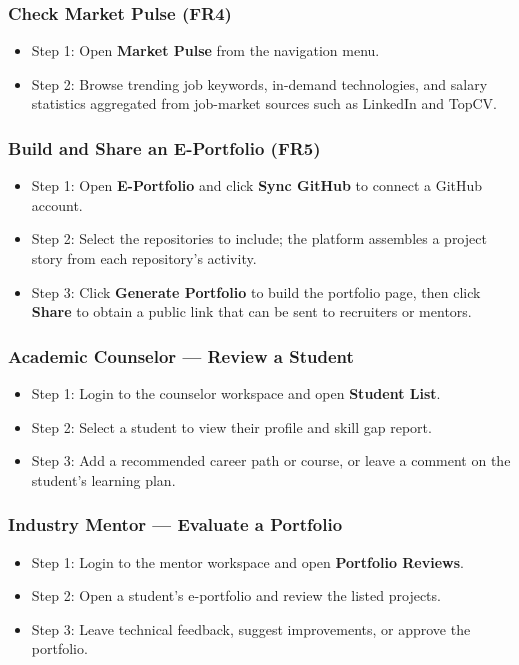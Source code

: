 \subsubsection{Check Market Pulse (FR4)}
\begin{itemize}[nosep]
    \item Step 1: Open \textbf{Market Pulse} from the navigation menu.
    \item Step 2: Browse trending job keywords, in-demand technologies, and salary statistics aggregated from job-market sources such as LinkedIn and TopCV.
\end{itemize}

\subsubsection{Build and Share an E-Portfolio (FR5)}
\begin{itemize}[nosep]
    \item Step 1: Open \textbf{E-Portfolio} and click \textbf{Sync GitHub} to connect a GitHub account.
    \item Step 2: Select the repositories to include; the platform assembles a project story from each repository's activity.
    \item Step 3: Click \textbf{Generate Portfolio} to build the portfolio page, then click \textbf{Share} to obtain a public link that can be sent to recruiters or mentors.
\end{itemize}

\subsubsection{Academic Counselor — Review a Student}
\begin{itemize}[nosep]
    \item Step 1: Login to the counselor workspace and open \textbf{Student List}.
    \item Step 2: Select a student to view their profile and skill gap report.
    \item Step 3: Add a recommended career path or course, or leave a comment on the student's learning plan.
\end{itemize}

\subsubsection{Industry Mentor — Evaluate a Portfolio}
\begin{itemize}[nosep]
    \item Step 1: Login to the mentor workspace and open \textbf{Portfolio Reviews}.
    \item Step 2: Open a student's e-portfolio and review the listed projects.
    \item Step 3: Leave technical feedback, suggest improvements, or approve the portfolio.
\end{itemize}


